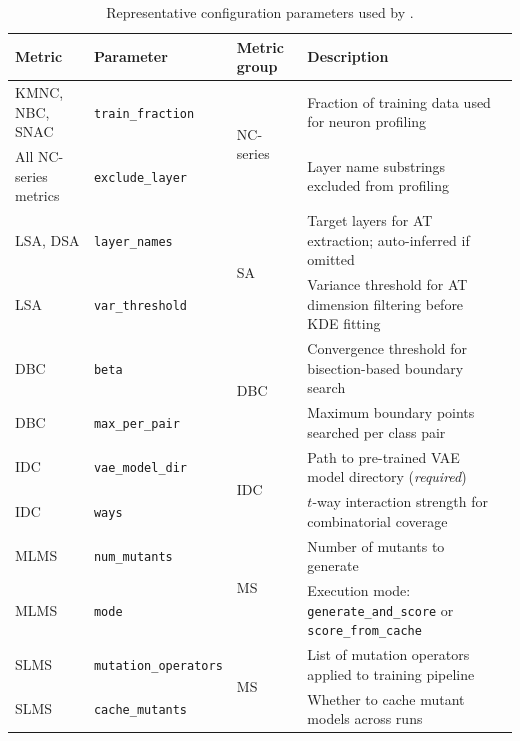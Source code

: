 \begin{table}[t]
    \centering
    \caption{Representative configuration parameters used by \tool. 
    }
    \label{tab:config}
     \setlength{\tabcolsep}{4pt}
    \renewcommand{\arraystretch}{0.8}
    \scriptsize
    \begin{tabular}{llllp{5.5cm}}
        \toprule
        \textbf{Metric} & \textbf{Parameter} & \textbf{Metric group} & \textbf{Description} \\
        \midrule
        KMNC, NBC, SNAC & \texttt{train\_fraction} & \multirow{2}{*}{NC-series} & Fraction of training data used for neuron profiling \\
        All NC-series metrics & \texttt{exclude\_layer}  & & Layer name substrings excluded from profiling \\
        \midrule
        LSA, DSA   & \texttt{layer\_names}   & \multirow{2}{*}{SA} & Target layers for AT extraction; auto-inferred if omitted \\
        LSA                  & \texttt{var\_threshold} &  & Variance threshold for AT dimension filtering before KDE fitting \\
        \midrule
        DBC       & \texttt{beta}           & \multirow{2}{*}{DBC} & Convergence threshold for bisection-based boundary search \\
        DBC                  & \texttt{max\_per\_pair} &  & Maximum boundary points searched per class pair \\
        \midrule
        IDC       & \texttt{vae\_model\_dir} & \multirow{2}{*}{IDC} & Path to pre-trained VAE model directory (\textit{required}) \\
        IDC                  & \texttt{ways}            &  & $t$-way interaction strength for combinatorial coverage \\
        \midrule
        MLMS  & \texttt{num\_mutants} & \multirow{2}{*}{MS} & Number of mutants to generate \\
        MLMS                        & \texttt{mode}         &  & Execution mode: \texttt{generate\_and\_score} or \texttt{score\_from\_cache} \\
        \midrule
        SLMS & \texttt{mutation\_operators} & \multirow{2}{*}{MS} & List of mutation operators applied to training pipeline \\
        SLMS                        & \texttt{cache\_mutants}       &  & Whether to cache mutant models across runs \\
        \bottomrule
    \end{tabular}
\end{table}
